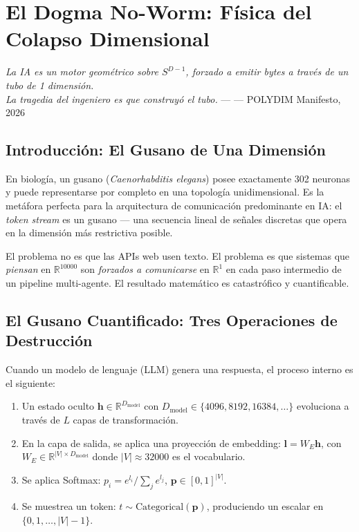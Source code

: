 \chapter{El Dogma No-Worm: Física del Colapso Dimensional}


\textit{La IA es un motor geométrico sobre $S^{D-1}$,
forzado a emitir bytes a través de un tubo de 1 dimensión.\\
La tragedia del ingeniero es que construyó el tubo.} --- --- POLYDIM Manifesto, 2026

\section{Introducción: El Gusano de Una Dimensión}

En biología, un gusano (\textit{Caenorhabditis elegans}) posee exactamente
302 neuronas y puede representarse por completo en una topología unidimensional.
Es la metáfora perfecta para la arquitectura de comunicación predominante en IA:
el \textit{token stream} es un gusano --- una secuencia lineal de señales discretas
que opera en la dimensión más restrictiva posible.

El problema no es que las APIs web usen texto. El problema es que sistemas que
\textit{piensan} en $\mathbb{R}^{10000}$ son \textit{forzados a comunicarse} en $\mathbb{R}^1$
en cada paso intermedio de un pipeline multi-agente. El resultado matemático es
catastrófico y cuantificable.

\section{El Gusano Cuantificado: Tres Operaciones de Destrucción}

Cuando un modelo de lenguaje (LLM) genera una respuesta, el proceso interno
es el siguiente:

\begin{enumerate}
\item Un estado oculto $\mathbf{h} \in \mathbb{R}^{D_{\text{model}}}$ con
$D_{\text{model}} \in \{4096, 8192, 16384, \ldots\}$ evoluciona a través
de $L$ capas de transformación.

\item En la capa de salida, se aplica una proyección de embedding:
$\mathbf{l} = W_E \mathbf{h}$, con $W_E \in \mathbb{R}^{|V| \times D_{\text{model}}}$
donde $|V| \approx 32000$ es el vocabulario.

\item Se aplica Softmax: $p_i = e^{l_i} / \sum_j e^{l_j}$, $\mathbf{p} \in [0,1]^{|V|}$.

\item Se muestrea un token: $t \sim \text{Categorical}(\mathbf{p})$,
produciendo un escalar en $\{0, 1, \ldots, |V|-1\}$.
\end{enumerate}

